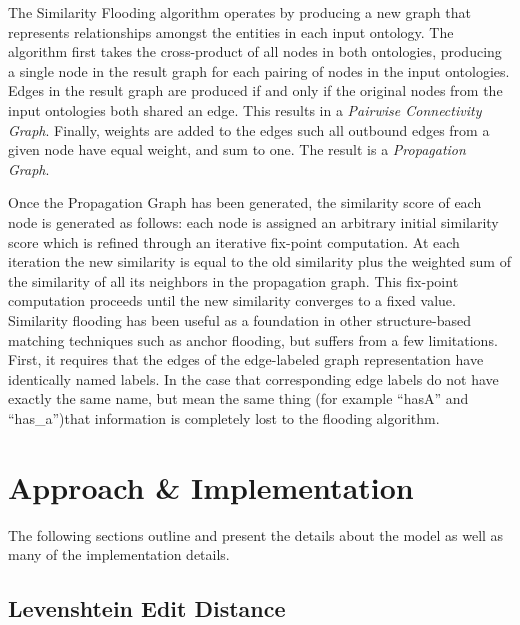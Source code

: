 \documentclass[letterpaper,twocolumn,12pt]{article}
\begin{document}
The Similarity Flooding algorithm operates by producing a new graph that represents relationships amongst the entities in each input ontology. 
The algorithm first takes the cross-product of all nodes in both ontologies, producing a single node in the result graph for each pairing of nodes in the input ontologies. 
Edges in the result graph are produced if and only if the original nodes from the input ontologies both shared an edge. 
This results in a \textit{Pairwise Connectivity Graph}.
Finally, weights are added to the edges such all outbound edges from a given node have equal weight, and sum to one. 
The result is a \textit{Propagation Graph}.

Once the Propagation Graph has been generated, the similarity score of each node is generated as follows: each node is assigned an arbitrary initial similarity
score which is refined through an iterative fix-point computation. 
At each iteration the new similarity is equal to the old similarity plus the weighted sum of the similarity of all its neighbors in the propagation graph. 
This fix-point computation proceeds until the new similarity converges to a fixed value.
%
Similarity flooding has been useful as a foundation in other structure-based matching techniques such as anchor flooding, but suffers from a few limitations. 
First, it requires that the edges of the edge-labeled graph representation have identically named labels. 
In the case that corresponding edge labels do not have exactly the same name, but mean the same thing (for example ``hasA'' and ``has\_a'')that information is completely lost to the flooding algorithm. 


\section{Approach \& Implementation}
\label{sec:approach}

The following sections outline and present the details about the model as well as many of the implementation details.

\subsection{Levenshtein Edit Distance}
\end{document}
